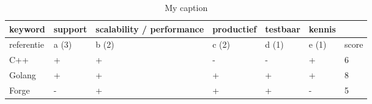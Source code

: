 \begin{table}[bh]
\caption{My caption}
\label{tab:matrix_hardware}
\begin{tabular}{|l|l|l|l|l|l|l|}
\hline
keyword    & support & scalability / performance & productief & testbaar & kennis &       \\ \hline
referentie & a (3)   & b (2)                     & c (2)      & d (1)    & e (1)  & score \\ \hline
C++        & +       & +                         & -          & -        & +      & 6     \\ \hline
Golang     & +       & +                         & +          & +        & +      & 8     \\ \hline
Forge      & -       & +                         & +          & +        & -      & 5     \\ \hline
\end{tabular}
\end{table}
